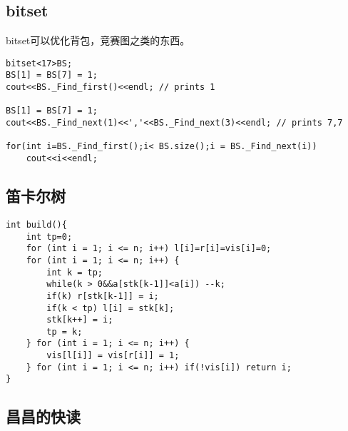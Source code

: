 \subsection{bitset}

bitset可以优化背包，竞赛图之类的东西。

\begin{lstlisting}
bitset<17>BS;
BS[1] = BS[7] = 1;
cout<<BS._Find_first()<<endl; // prints 1

BS[1] = BS[7] = 1;
cout<<BS._Find_next(1)<<','<<BS._Find_next(3)<<endl; // prints 7,7

for(int i=BS._Find_first();i< BS.size();i = BS._Find_next(i))
    cout<<i<<endl;
\end{lstlisting}

\subsection{笛卡尔树}

\begin{lstlisting}
int build(){
    int tp=0;
    for (int i = 1; i <= n; i++) l[i]=r[i]=vis[i]=0;
    for (int i = 1; i <= n; i++) {
        int k = tp;
        while(k > 0&&a[stk[k-1]]<a[i]) --k;
        if(k) r[stk[k-1]] = i;
        if(k < tp) l[i] = stk[k];
        stk[k++] = i;
        tp = k;
    } for (int i = 1; i <= n; i++) {
        vis[l[i]] = vis[r[i]] = 1;
    } for (int i = 1; i <= n; i++) if(!vis[i]) return i;
}
\end{lstlisting}

\subsection{昌昌的快读}

